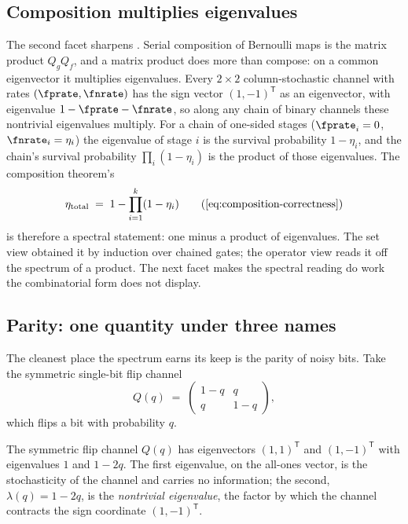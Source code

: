 \subsection*{Composition multiplies eigenvalues}

The second facet sharpens . Serial
composition of Bernoulli maps is the matrix product $Q_g Q_f$, and a matrix
product does more than compose: on a common eigenvector it multiplies
eigenvalues. Every $2 \times 2$ column-stochastic channel with rates
$(\fprate, \fnrate)$ has the sign vector $(1, -1)^{\mathsf{T}}$ as an
eigenvector, with eigenvalue $1 - \fprate - \fnrate$, so along any chain
of binary channels these nontrivial eigenvalues multiply. For a chain of
one-sided stages ($\fprate_i = 0$, $\fnrate_i = \eta_i$) the eigenvalue of
stage $i$ is the survival probability $1 - \eta_i$, and the chain's
survival probability $\prod_i (1 - \eta_i)$ is the product of those
eigenvalues. The composition
theorem's
\[
  \eta_{\mathrm{total}} \;=\; 1 - \prod_{i=1}^{k}(1 - \eta_i)
  \tag{\Cref{eq:composition-correctness}}
\]
is therefore a spectral statement: one minus a product of eigenvalues. The set
view obtained it by induction over chained gates; the operator view reads it off
the spectrum of a product. The next facet makes the spectral reading do work the
combinatorial form does not display.

\subsection*{Parity: one quantity under three names}

The cleanest place the spectrum earns its keep is the parity of noisy bits. Take
the symmetric single-bit flip channel
\[
  Q(q) \;=\;
  \begin{pmatrix}
    1 - q & q \\
    q & 1 - q
  \end{pmatrix},
\]
which flips a bit with probability $q$.

\begin{definition}
\label{def:walsh-eigenvalue}
The symmetric flip channel $Q(q)$ has eigenvectors $(1, 1)^{\mathsf{T}}$ and
$(1, -1)^{\mathsf{T}}$ with eigenvalues $1$ and $1 - 2q$. The first eigenvalue,
on the all-ones vector, is the stochasticity of the channel and carries no
information; the second, $\lambda(q) = 1 - 2q$, is the \emph{nontrivial
eigenvalue}, the factor by which the channel contracts the sign coordinate
$(1, -1)^{\mathsf{T}}$.
\end{definition}

